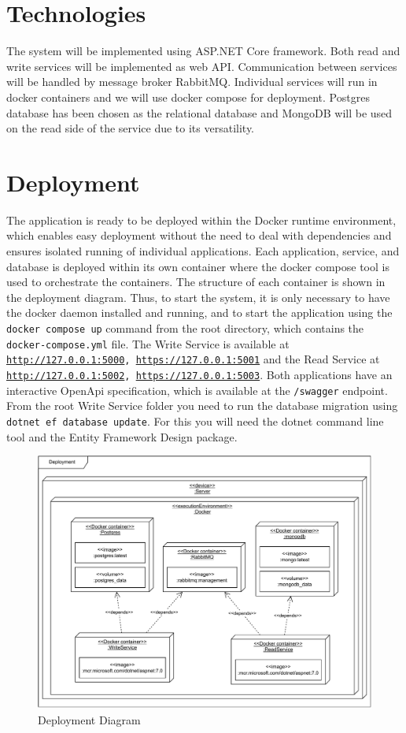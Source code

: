 \documentclass[12pt,english]{article}
\begin{document}
\section{Technologies}
The system will be implemented using ASP.NET Core framework. Both read and write services will be implemented as web API. Communication between services will be handled by message broker RabbitMQ. Individual services will run in docker containers and we will use docker compose for deployment. Postgres database has been chosen as the relational database and MongoDB will be used on the read side of the service due to its versatility.

\section{Deployment}
The application is ready to be deployed within the Docker runtime environment, which enables easy deployment without the need to deal with dependencies and ensures isolated running of individual applications. Each application, service, and database is deployed within its own container where the docker compose tool is used to orchestrate the containers. The structure of each container is shown in the deployment diagram. Thus, to start the system, it is only necessary to have the docker daemon installed and running, and to start the application using the \texttt{docker compose up} command from the root directory, which contains the \texttt{docker-compose.yml} file. The Write Service is available at \texttt{\url{http://127.0.0.1:5000}, \url{https://127.0.0.1:5001}} and the Read Service at \texttt{\url{http://127.0.0.1:5002}, \url{https://127.0.0.1:5003}}. Both applications have an interactive OpenApi specification, which is available at the \texttt{/swagger} endpoint. From the root Write Service folder you need to run the database migration using \texttt{dotnet ef database update}. For this you will need the dotnet command line tool and the Entity Framework Design package.

\begin{figure}[tbhp]
    \centering
    \includegraphics[scale=.8]{images/Deployment.pdf}
    \caption{Deployment Diagram}
\end{figure}
\end{document}
